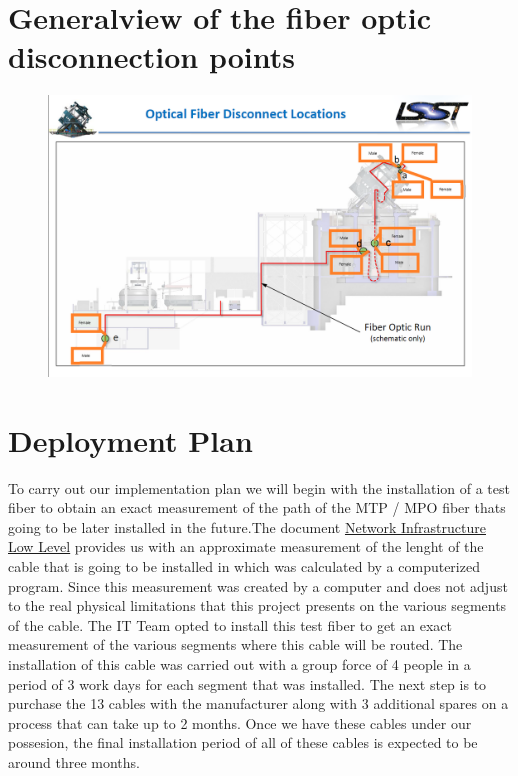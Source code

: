 \section{Generalview of the fiber optic disconnection points}
\vspace{30 mm}
\begin{figure}
  \centering
  \includegraphics[width=17cm]{images/33333.png}
\end{figure}

\newpage

\section{Deployment Plan}
To carry out our implementation plan we will begin with the installation of a test fiber to obtain an exact measurement of the path of the MTP / MPO fiber thats going to be later installed in the future.The document \href{https://confluence.lsstcorp.org/display/IT/Network+Infrastructure+Low-Level+Design+LLD?preview=/139036736/140285500/Telescope-Camera%20Optical%20Fibers%20layout%20v3.pdf}{Network Infrastructure Low Level} provides us with an approximate measurement of the lenght of the cable that is going to be installed in which was calculated by a computerized program. Since this measurement was created by a computer and does not adjust to the real physical limitations that this project presents on the various segments of the cable. The IT Team opted to install this test fiber to get an exact measurement of the various segments where this cable will be routed.
The installation of this cable was carried out with a group force of 4 people in a period of 3 work days for each segment that was installed. The next step is to purchase the 13 cables with the manufacturer along with 3 additional spares on a process that can take up to 2 months. Once we have these cables under our possesion, the final installation period of all of these cables is expected to be around three months.

